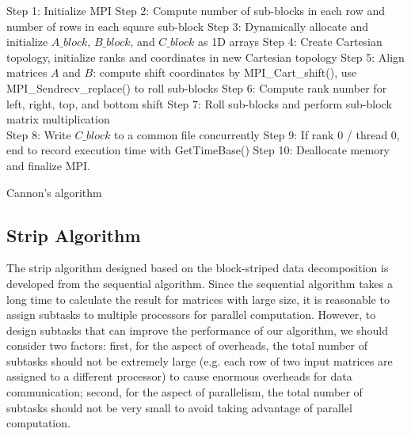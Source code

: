 \documentclass[conference]{IEEEtran}
\begin{document}
\begin{algorithm}
\SetAlgoLined
{}
 \Begin
  {Step 1: Initialize MPI\;
   Step 2: Compute number of sub-blocks in each row and number of rows in each square sub-block\;
   Step 3: Dynamically allocate and initialize $A\_block$, $B\_block$, and $C\_block$ as 1D arrays\;
   Step 4: Create Cartesian topology, initialize ranks and coordinates in new Cartesian topology\;
   Step 5: Align matrices $A$ and $B$: compute shift coordinates by MPI\_Cart\_shift(), use MPI\_Sendrecv\_replace() to roll sub-blocks\; 
   Step 6: Compute rank number for left, right, top, and bottom shift\;
   Step 7: Roll sub-blocks and perform sub-block matrix multiplication\\
    Step 8: Write $C\_block$ to a common file concurrently\;
    Step 9: If rank 0 / thread 0, end to record execution time with GetTimeBase()\;
    Step 10: Deallocate memory and finalize MPI.
  }
 \End
 \caption{Cannon's algorithm}
 \label{alg:cannon}
\end{algorithm}



\subsection{Strip Algorithm}

The strip algorithm designed based on the block-striped data decomposition is developed from the sequential algorithm. Since the sequential algorithm takes a long time to calculate the result for matrices with large size, it is reasonable to assign subtasks to multiple processors for parallel computation. However, to design subtasks that can improve the performance of our algorithm, we should consider two factors: first, for the aspect of overheads, the total number of subtasks should not be extremely large (e.g. each row of two input matrices are assigned to a different processor) to cause enormous overheads for data communication; second, for the aspect of parallelism, the total number of subtasks should not be very small to avoid taking advantage of parallel computation. 
\end{document}
